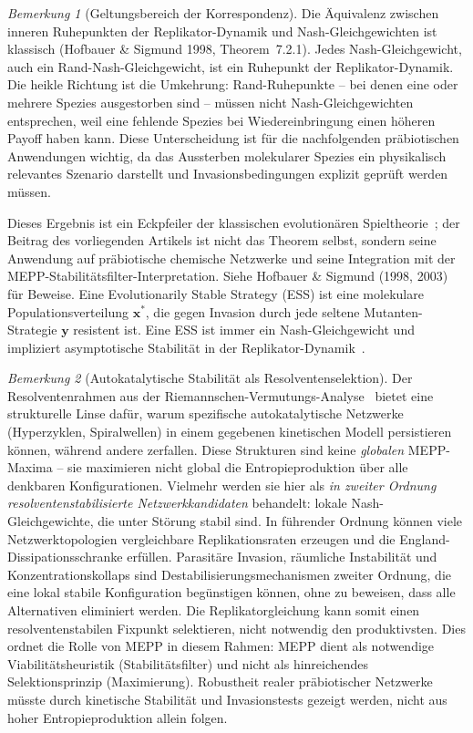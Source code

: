 \documentclass[12pt,a4paper]{article}
\theoremstyle{remark}
\newtheorem{remark}{Bemerkung}
\begin{document}
\begin{remark}[Geltungsbereich der Korrespondenz]
Die Äquivalenz zwischen inneren Ruhepunkten der Replikator-Dynamik und Nash-Gleichgewichten ist klassisch (Hofbauer \& Sigmund 1998, Theorem~7.2.1). Jedes Nash-Gleichgewicht, auch ein Rand-Nash-Gleichgewicht, ist ein Ruhepunkt der Replikator-Dynamik. Die heikle Richtung ist die Umkehrung: Rand-Ruhepunkte -- bei denen eine oder mehrere Spezies ausgestorben sind -- müssen nicht Nash-Gleichgewichten entsprechen, weil eine fehlende Spezies bei Wiedereinbringung einen höheren Payoff haben kann. Diese Unterscheidung ist für die nachfolgenden präbiotischen Anwendungen wichtig, da das Aussterben molekularer Spezies ein physikalisch relevantes Szenario darstellt und Invasionsbedingungen explizit geprüft werden müssen.
\end{remark}

Dieses Ergebnis ist ein Eckpfeiler der klassischen evolutionären Spieltheorie~\citep{Weibull1995}; der Beitrag des vorliegenden Artikels ist nicht das Theorem selbst, sondern seine Anwendung auf präbiotische chemische Netzwerke und seine Integration mit der MEPP-Stabilitätsfilter-Interpretation. Siehe Hofbauer \& Sigmund (1998, 2003) für Beweise. Eine Evolutionarily Stable Strategy (ESS) ist eine molekulare Populationsverteilung $\mathbf{x}^*$, die gegen Invasion durch jede seltene \glqq Mutanten\grqq{}-Strategie $\mathbf{y}$ resistent ist. Eine ESS ist immer ein Nash-Gleichgewicht und impliziert asymptotische Stabilität in der Replikator-Dynamik~\citep{HofbauerSigmund1998}.

\begin{remark}[Autokatalytische Stabilität als Resolventenselektion]
\label{rem:autocatalysis-resolvent}
Der Resolventenrahmen aus der Riemannschen-Vermutungs-Analyse~\citep{GeigerRH2026b} bietet eine strukturelle Linse dafür, warum spezifische autokatalytische Netzwerke (Hyperzyklen, Spiralwellen) in einem gegebenen kinetischen Modell persistieren können, während andere zerfallen. Diese Strukturen sind keine \emph{globalen} MEPP-Maxima -- sie maximieren nicht global die Entropieproduktion über alle denkbaren Konfigurationen. Vielmehr werden sie hier als \emph{in zweiter Ordnung resolventenstabilisierte Netzwerkkandidaten} behandelt: lokale Nash-Gleichgewichte, die unter Störung stabil sind. In führender Ordnung können viele Netzwerktopologien vergleichbare Replikationsraten erzeugen und die England-Dissipationsschranke erfüllen. Parasitäre Invasion, räumliche Instabilität und Konzentrationskollaps sind Destabilisierungsmechanismen zweiter Ordnung, die eine lokal stabile Konfiguration begünstigen können, ohne zu beweisen, dass alle Alternativen eliminiert werden. Die Replikatorgleichung kann somit einen resolventenstabilen Fixpunkt selektieren, nicht notwendig den produktivsten. Dies ordnet die Rolle von MEPP in diesem Rahmen: MEPP dient als notwendige Viabilitätsheuristik (Stabilitätsfilter) und nicht als hinreichendes Selektionsprinzip (Maximierung). Robustheit realer präbiotischer Netzwerke müsste durch kinetische Stabilität und Invasionstests gezeigt werden, nicht aus hoher Entropieproduktion allein folgen.
\end{remark}
\end{document}
